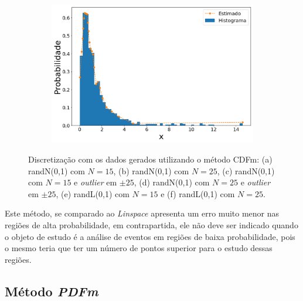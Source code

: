 \begin{figure}[H]
\begin{subfigure}[b]{0.45\textwidth}
		\caption{}
		\label{fig:cdf_lognorm15_data}
	\end{subfigure}
	\hfill
	\begin{subfigure}[b]{0.45\textwidth}
		\centering 
		\includegraphics[width=\linewidth]{./figuras/CDFm_lognormal_25_1000_0}
		\caption{}
		\label{fig:cdf_lognorm25_data}
	\end{subfigure}
	\caption{Discretização com os dados gerados utilizando o método \ac{CDFm}: (a) randN(0,1) com $N = 15$, (b) randN(0,1) com $N = 25$, (c) randN(0,1) com $N = 15$ e \textit{outlier} em $\pm 25$, (d) randN(0,1) com $N = 25$ e \textit{outlier} em $\pm 25$, (e) randL(0,1) com $ N = 15 $ e (f) randL(0,1) com $ N = 25 $.}
	\label{fig:cdf_data}
\end{figure}

Este método, se comparado ao \textit{Linspace} apresenta um erro muito menor nas regiões de alta probabilidade, em contrapartida, ele não deve ser indicado quando o objeto de estudo é a análise de eventos em regiões de baixa probabilidade, pois o mesmo teria que ter um número de pontos superior para o estudo dessas regiões.

\subsection{Método \textit{PDFm}}

